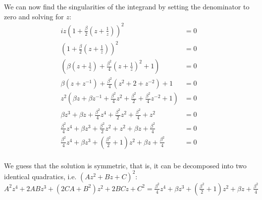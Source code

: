 \begin{example}
    We can now find the singularities of the integrand by setting the denominator to zero and solving for $z$:
    \begin{align*}
        iz(1 + \frac{\beta}{2}(z + \frac{1}{z}))^{2}                                                                   & = 0 \\
        (1 + \frac{\beta}{2}(z + \frac{1}{z}))^{2}                                                                     & = 0 \\
        (\beta (z + \frac{1}{z}) + \frac{\beta^2}{4}(z + \frac{1}{z})^2 + 1)                                           & = 0 \\
        \beta (z + z^{-1}) + \frac{\beta^2}{4}(z^2 + 2 + z^{-2}) + 1                                                   & = 0 \\
        z^2\left(\beta z + \beta z^{-1} + \frac{\beta^2}{4}z^2 + \frac{\beta^2}{2} + \frac{\beta^2}{4}z^{-2} +1\right) & = 0 \\
        \beta z^3 + \beta z + \frac{\beta^2}{4}z^4 + \frac{\beta^2}{2}z^2 + \frac{\beta^2}{4} + z^2                    & = 0 \\
        \frac{\beta^2}{4}z^4 + \beta z^3 + \frac{\beta^2}{2}z^2 + z^2 + \beta z + \frac{\beta^2}{4}                    & = 0 \\
        \frac{\beta^2}{4}z^4 + \beta z^3 + (\frac{\beta^2}{2} + 1)z^2 + \beta z + \frac{\beta^2}{4}                    & = 0 \\
    \end{align*}

    We guess that the solution is symmetric, that is, it can be decomposed into two identical quadratics, i.e. $(Az^2 + Bz + C)^2$:\\
    $A^2 z^4 + 2ABz^3 + (2CA + B^2) z^2 + 2BCz + C^2 = \frac{\beta^2}{4}z^4 + \beta z^3 + (\frac{\beta^2}{2} + 1)z^2 + \beta z + \frac{\beta^2}{4}$\\


\end{example}
